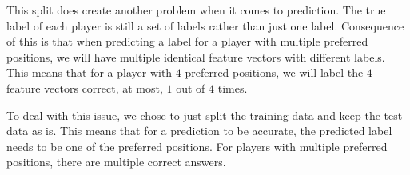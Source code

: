 \par
This split does create another problem when it comes to prediction. The true label of each player is still a set of labels rather than just one label. Consequence of this is that when predicting a label for a player with multiple preferred positions, we will have multiple identical feature vectors with different labels. This means that for a player with $4$ preferred positions, we will label the $4$ feature vectors correct, at most, $1$ out of $4$ times.
\par
To deal with this issue, we chose to just split the training data and keep the test data as is. This means that for a prediction to be accurate, the predicted label needs to be one of the preferred positions. For players with multiple preferred positions, there are multiple correct answers. 
